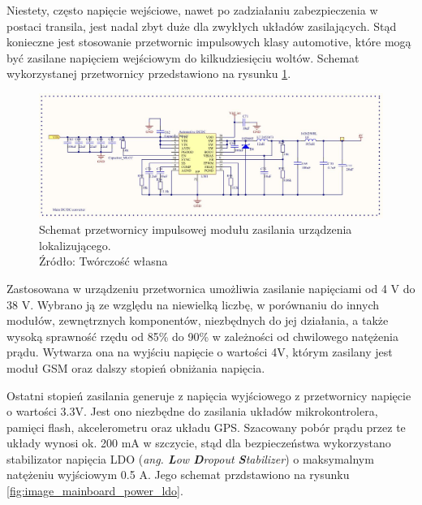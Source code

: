 Niestety, często napięcie wejściowe, nawet po zadziałaniu zabezpieczenia w postaci transila, jest nadal zbyt duże dla zwykłych układów zasilających. Stąd konieczne jest stosowanie przetwornic impulsowych klasy automotive, które mogą być zasilane napięciem wejściowym do kilkudziesięciu woltów. Schemat wykorzystanej przetwornicy przedstawiono na rysunku \ref{fig:image_mainboard_power_converter}.

\begin{figure}[H]
	\centering
	\includegraphics[width=17cm]{img/schematics/mainboard_power_converter.jpg}
	\caption{Schemat przetwornicy impulsowej modułu zasilania urządzenia lokalizującego. \\ Źródło: Twórczość własna}
	\label{fig:image_mainboard_power_converter}
\end{figure}

Zastosowana w urządzeniu przetwornica umożliwia zasilanie napięciami od 4 V do 38 V. Wybrano ją ze względu na niewielką liczbę, w porównaniu do innych modułów, zewnętrznych komponentów, niezbędnych do jej działania, a także wysoką sprawność rzędu od 85\% do 90\% w zależności od chwilowego natężenia prądu. Wytwarza ona na wyjściu napięcie o wartości 4V, którym zasilany jest moduł GSM oraz dalszy stopień obniżania napięcia.

Ostatni stopień zasilania generuje z napięcia wyjściowego z przetwornicy napięcie o wartości 3.3V. Jest ono niezbędne do zasilania układów mikrokontrolera, pamięci flash, akcelerometru oraz układu GPS. Szacowany pobór prądu przez te układy wynosi ok. 200 mA w szczycie, stąd dla bezpieczeństwa wykorzystano stabilizator napięcia LDO (\textit{ang. \textbf{L}ow \textbf{D}ropout \textbf{S}tabilizer}) o maksymalnym natężeniu wyjściowym 0.5 A. Jego schemat przdstawiono na rysunku \ref{fig:image_mainboard_power_ldo}.

